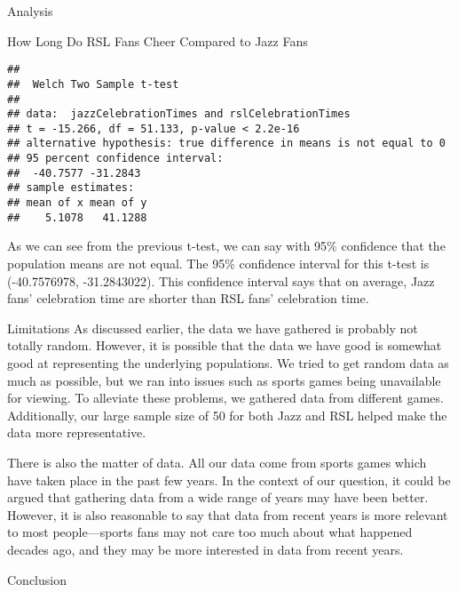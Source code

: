 \documentclass[
  ignorenonframetext,
]{beamer}
\begin{document}
\begin{frame}[fragile]{Analysis}
\begin{block}{How Long Do RSL Fans Cheer Compared to Jazz Fans}
\begin{verbatim}
## 
##  Welch Two Sample t-test
## 
## data:  jazzCelebrationTimes and rslCelebrationTimes
## t = -15.266, df = 51.133, p-value < 2.2e-16
## alternative hypothesis: true difference in means is not equal to 0
## 95 percent confidence interval:
##  -40.7577 -31.2843
## sample estimates:
## mean of x mean of y 
##    5.1078   41.1288
\end{verbatim}

As we can see from the previous t-test, we can say with 95\% confidence
that the population means are not equal. The 95\% confidence interval
for this t-test is (-40.7576978, -31.2843022). This confidence interval
says that on average, Jazz fans' celebration time are shorter than RSL
fans' celebration time.
\end{block}
\end{frame}

\begin{frame}{Limitations}
\protect\hypertarget{limitations}{}
As discussed earlier, the data we have gathered is probably not totally
random. However, it is possible that the data we have good is somewhat
good at representing the underlying populations. We tried to get random
data as much as possible, but we ran into issues such as sports games
being unavailable for viewing. To alleviate these problems, we gathered
data from different games. Additionally, our large sample size of 50 for
both Jazz and RSL helped make the data more representative.

There is also the matter of data. All our data come from sports games
which have taken place in the past few years. In the context of our
question, it could be argued that gathering data from a wide range of
years may have been better. However, it is also reasonable to say that
data from recent years is more relevant to most people---sports fans may
not care too much about what happened decades ago, and they may be more
interested in data from recent years.
\end{frame}

\begin{frame}{Conclusion}
\protect\hypertarget{conclusion}{}
\end{frame}
\end{document}
